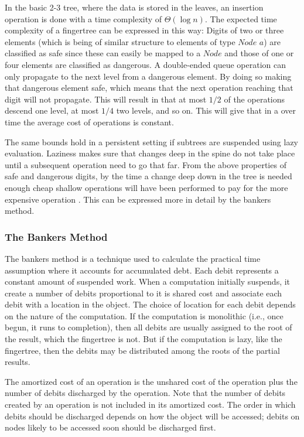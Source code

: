 In the basic 2-3 tree, where the data is stored in the leaves, an insertion
operation is done with a time complexity of $\Theta (\log n)$. The expected 
time complexity of a fingertree can be expressed in this way:
Digits of two or three elements (which is being of similar structure to elements
of type $Node$ $a$) are classified as safe since these can easily be mapped to a
$Node$ and those of one or four elements are classified as dangerous. A
double-ended queue operation can only propagate to the next level from a
dangerous element. By doing so making that dangerous element safe, which means
that the next operation reaching that digit will not propagate. This will result
in that at most $1/2$ of the operations descend one level, at most $1/4$ two
levels, and so on. This will give that in a over time the average cost of
operations is constant.

The same bounds hold in a persistent setting if subtrees are suspended using lazy
evaluation. Laziness makes sure that changes deep in the spine do not take place
until a subsequent operation need to go that far. From the above properties of
safe and dangerous digits, by the time a change deep down in the tree is needed
enough cheap shallow operations will have been performed to pay for the more
expensive operation \cite{fingertree}. This can be expressed more in detail by
the bankers method.

\subsubsection{The Bankers Method}
The bankers method is a technique used to calculate the practical time
assumption where it accounts for accumulated debt. Each debit represents
a constant amount of suspended work. When a computation initially suspends, it
create a number of debits proportional to it is shared cost and
associate each debit with a location in the object. The choice of location for
each debit depends on the nature of the computation. If the computation is
monolithic (i.e., once begun, it runs to completion), then all debits are
usually assigned to the root of the result, which the fingertree is not.
But if the computation is lazy, like the fingertree, then the debits may be
distributed among the roots of the partial results.

The amortized cost of an operation is the unshared cost of the operation
plus the number of debits discharged by the operation. Note that the number
of debits created by an operation is not included in its amortized cost. The
order in which debits should be discharged depends on how the object will
be accessed; debits on nodes likely to be accessed soon should be discharged
first.

